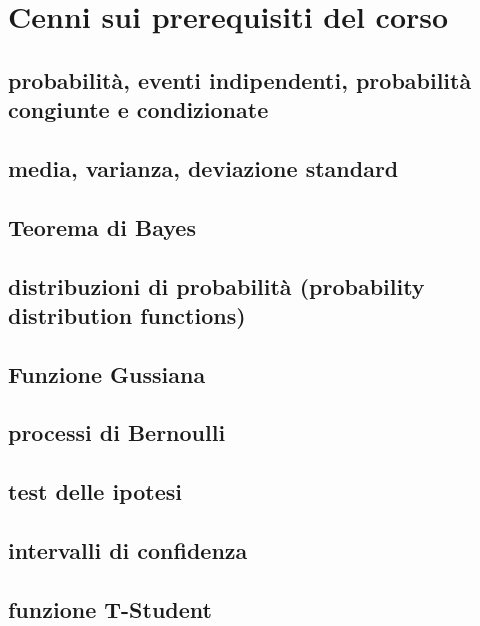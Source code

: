 \chapter{Cenni sui prerequisiti del corso}
\section{probabilità, eventi indipendenti, probabilità congiunte e condizionate}

\section{media, varianza, deviazione standard}

\section{Teorema di Bayes}

\section{distribuzioni di probabilità (probability distribution functions)}

\section{Funzione Gussiana}

\section{processi di Bernoulli}

\section{test delle ipotesi}

\section{intervalli di confidenza}

\section{funzione T-Student}